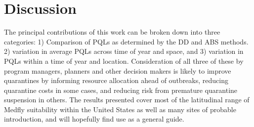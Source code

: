 \documentclass[10pt,a4paper,twocolumn]{article}
\begin{document}




\section*{Discussion}

The principal contributions of this work can be broken down into three categories: 
1) Comparison of PQLs as determined by the DD and ABS methods. 
2) variation in average PQLs across time of year and space, and
3) variation in PQLs within a time of year and location.
Consideration of all three of these by program managers, planners and other decision makers 
is likely to improve quarantines by informing resource allocation ahead of outbreaks, reducing 
quarantine costs in some cases, and reducing risk from premature quarantine suspension in others. 
The results presented cover most of the latitudinal range 
of Medfly suitability within the United States 
as well as many sites of probable introduction,
and will hopefully find use as a general guide.
\end{document}
